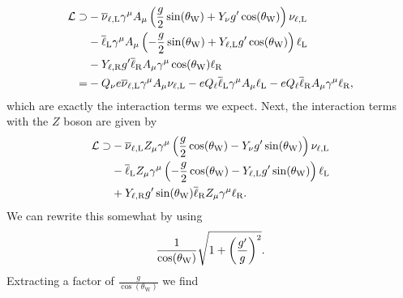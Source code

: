 \begin{align*}
	\mathcal{L} \supset& -\overline{\nu}_{\ell, \text{L}}\gamma^{\mu}A_{\mu}\left(\frac{g}{2}\sin(\theta_{\text{W}}) + Y_{\nu}g^{\prime}\cos(\theta_{\text{W}})\right)\nu_{\ell, \text{L}} \\
	&- \overline{\ell}_{\text{L}}\gamma^{\mu}A_{\mu}\left(-\frac{g}{2}\sin(\theta_{\text{W}}) + Y_{\ell, \text{L}}g^{\prime} \cos(\theta_{\text{W}})\right)\ell_{\text{L}} \\
	&- Y_{\ell, \text{R}}g^{\prime}\overline{\ell}_{\text{R}}A_{\mu}\gamma^{\mu}\cos(\theta_{\text{W}})\ell_{\text{R}} \\
	=& -Q_{\nu}e\overline{\nu}_{\ell, \text{L}}\gamma^{\mu}A_{\mu}\nu_{\ell, \text{L}} - eQ_{\ell}\overline{\ell}_{\text{L}}\gamma^{\mu}A_{\mu}\ell_{\text{L}} - eQ_{\ell}\overline{\ell}_{\text{R}}A_{\mu}\gamma^{\mu}\ell_{\text{R}},
\end{align*}
which are exactly the interaction terms we expect. Next, the interaction terms with the $Z$ boson are given by
\begin{align*}
	\mathcal{L} \supset& -\overline{\nu}_{\ell, \text{L}}Z_{\mu}\gamma^{\mu}\left(\frac{g}{2}\cos(\theta_{\text{W}}) - Y_{\nu}g^{\prime}\sin(\theta_{\text{W}})\right)\nu_{\ell, \text{L}} \\
	&- \overline{\ell}_{\text{L}}Z_{\mu}\gamma^{\mu}\left(-\frac{g}{2}\cos(\theta_{\text{W}}) - Y_{\ell, \text{L}}g^{\prime}\sin(\theta_{\text{W}})\right)\ell_{\text{L}} \\
	&+ Y_{\ell, \text{R}}g^{\prime}\sin(\theta_{\text{W}})\overline{\ell}_{\text{R}}Z_{\mu}\gamma^{\mu}\ell_{\text{R}}.
\end{align*}
We can rewrite this somewhat by using
\begin{align*}
	\frac{1}{\cos(\theta_{\text{W}})} \sqrt{1 + \left(\frac{g^{\prime}}{g}\right)^{2}}.
\end{align*}
Extracting a factor of $\frac{g}{\cos(\theta_{\text{W}})}$ we find

